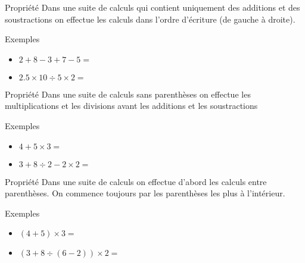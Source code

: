 \documentclass[xcolor={dvipsnames}]{beamer}
\begin{document}
\begin{frame}{}
	\begin{alertblock}{Propriété}
		Dans une suite de calculs qui contient uniquement des additions et des soustractions on effectue les calculs dans l'ordre d'écriture (de gauche à droite).
	\end{alertblock}
	
	
	\begin{exampleblock}{Exemples}
		\begin{itemize}
			\item $2 + 8 - 3 + 7 - 5 =$ \vspace*{2cm}
			
			
			\item $ \num{2.5} \times 10 \div 5 \times 2 = $\vspace*{1cm}
		\end{itemize}
	\end{exampleblock}
\end{frame}


\begin{frame}{}
	\begin{alertblock}{Propriété}
		Dans une suite de calculs sans parenthèses on effectue les multiplications et les divisions avant les additions et les soustractions
	\end{alertblock}
	
	
	\begin{exampleblock}{Exemples}
		\begin{itemize}
			\item $4 + 5 \times 3 = $ \vspace*{2cm}
			
			
			\item $ 3 + 8 \div 2 - 2 \times 2 = $\vspace*{1cm}
		\end{itemize}
	\end{exampleblock}
\end{frame}

\begin{frame}{}
	\begin{alertblock}{Propriété}
		Dans une suite de calculs on effectue d'abord les calculs entre parenthèses. On commence toujours par les parenthèses les plus à l'intérieur.
	\end{alertblock}
	
	
	\begin{exampleblock}{Exemples}
		\begin{itemize}
			\item $(4 + 5) \times 3 =$  \vspace*{2cm}
			
			
			\item $ (3 + 8 \div (6 - 2)) \times 2 = $ \vspace*{1cm}
		\end{itemize}
	\end{exampleblock}
\end{frame}
\end{document}
